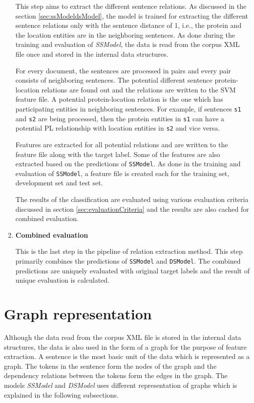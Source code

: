 \begin{enumerate}
This step aims to extract the different sentence relations. As discussed in the section \ref{sec:ssModeldsModel}, the model is trained for extracting the different sentence relations only with the sentence distance of 1, i.e., the protein and the location entities are in the neighboring sentences. As done during the training and evaluation of \textit{SSModel}, the data is read from the corpus XML file once and stored in the internal data structures.

For every document, the sentences are processed in pairs and every pair consists of neighboring sentences. The potential different sentence protein-location relations are found out and the relations are written to the SVM feature file. A potential protein-location relation is the one which has participating entities in  neighboring sentences. For example, if sentences \texttt{s1} and \texttt{s2} are being processed, then the protein entities in \texttt{s1} can have a potential PL relationship with location entities in \texttt{s2} and vice versa.

Features are extracted for all potential relations and are written to the feature file along with the target label. Some of the features are also extracted based on the predictions of \texttt{SSModel}. As done in the training and evaluation of \texttt{SSModel}, a feature file is created each for the training set, development set and test set. 

The results of the classification are evaluated using various evaluation criteria discussed in section \ref{sec:evaluationCriteria} and the results are also cached for combined evaluation.

\item \textbf{Combined evaluation}

This is the last step in the pipeline of relation extraction method. This step primarily combines the predictions of \texttt{SSModel} and \texttt{DSModel}. The  combined predictions are uniquely evaluated with original target labels and the result of unique evaluation is calculated.

\end{enumerate}

\section{Graph representation} \label{sec:graphRep}

Although the data read from the corpus XML file is stored in the internal data structures, the data is also used in the form of a graph for the purpose of feature extraction. A sentence is the most basic unit of the data which is represented as a graph. The tokens in the sentence form the nodes of the graph and the dependency relations between the tokens form the edges in the graph. The models \textit{SSModel} and \textit{DSModel} uses different representation of graphs which is explained in the following subsections.

